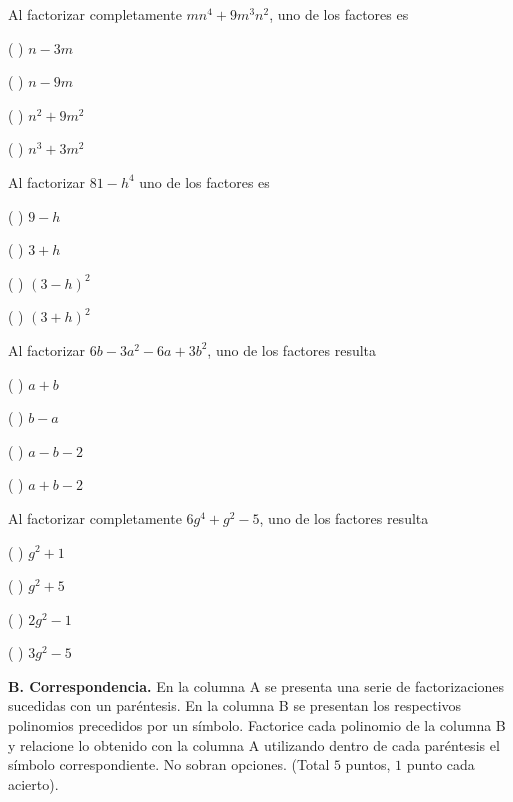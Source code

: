 \documentclass[fleqn]{article}
\begin{document}
\item Al factorizar completamente $mn^4+9m^3n^2$, uno de los factores es
\vs

\benu
\item[] (  ) $n-3m$
\item[] (  ) $n-9m$
\item[] (  ) $n^2+9m^2$
\item[] (  ) $n^3+3m^2$
\eenu
\vs\vs

\item Al factorizar $81-h^4$ uno de los factores es
\vs

\benu
\item[] (  ) $9-h$
\item[] (  ) $3+h$
\item[] (  ) $(3-h)^2$
\item[] (  ) $(3+h)^2$
\eenu
\vs\vs

\item Al factorizar $6b-3a^2-6a+3b^2$, uno de los factores resulta
\vs

\benu
\item[] (  ) $a+b$
\item[] (  ) $b-a$
\item[] (  ) $a-b-2$
\item[] (  ) $a+b-2$
\eenu
\vs\vs

\item Al factorizar completamente $6g^4+g^2-5$, uno de los factores resulta 
\vs

\benu
\item[] (  ) $g^2+1$
\item[] (  ) $g^2+5$
\item[] (  ) $2g^2-1$
\item[] (  ) $3g^2-5$
\eenu
\vs

\eenu

\pagebreak

{\bf B. Correspondencia.} En la columna A se presenta una serie de factorizaciones sucedidas con un paréntesis. En la columna B se presentan los respectivos polinomios precedidos por un símbolo. Factorice cada polinomio de la columna B y relacione lo obtenido con la columna A utilizando dentro de cada paréntesis el símbolo correspondiente. No sobran opciones. (Total $5$ puntos, $1$ punto cada acierto).
\vs\vs
\end{document}
